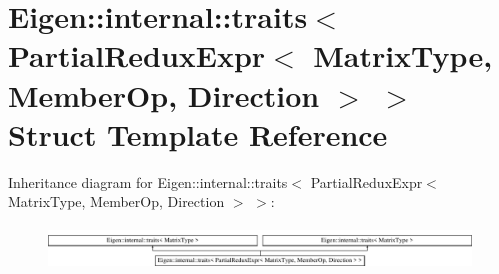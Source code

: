 \hypertarget{struct_eigen_1_1internal_1_1traits_3_01_partial_redux_expr_3_01_matrix_type_00_01_member_op_00_01_direction_01_4_01_4}{}\section{Eigen\+:\+:internal\+:\+:traits$<$ Partial\+Redux\+Expr$<$ Matrix\+Type, Member\+Op, Direction $>$ $>$ Struct Template Reference}
\label{struct_eigen_1_1internal_1_1traits_3_01_partial_redux_expr_3_01_matrix_type_00_01_member_op_00_01_direction_01_4_01_4}
Inheritance diagram for Eigen\+:\+:internal\+:\+:traits$<$ Partial\+Redux\+Expr$<$ Matrix\+Type, Member\+Op, Direction $>$ $>$\+:\begin{figure}[H]
\begin{center}
\leavevmode
\includegraphics[height=1.183932cm]{struct_eigen_1_1internal_1_1traits_3_01_partial_redux_expr_3_01_matrix_type_00_01_member_op_00_01_direction_01_4_01_4}
\end{center}
\end{figure}
